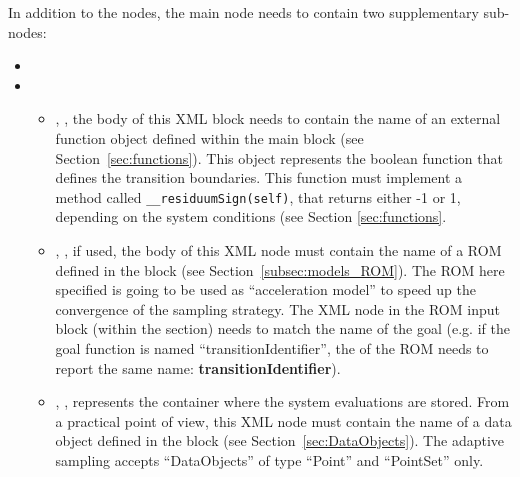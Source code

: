 In addition to the  nodes, the main
 node needs to contain two supplementary
sub-nodes:

\begin{itemize}
  \item \convergenceDescription
  \item {}
    \begin{itemize}
      \item {}, ,  the
        body of this XML block needs to contain the name of an external
        function object defined within the  main block (see
        Section~\ref{sec:functions}).
        This object represents the boolean function that defines the transition
        boundaries.
        This function must implement a method called
        \texttt{\_\_residuumSign(self)}, that returns either -1 or 1, depending
        on the system conditions (see Section \ref{sec:functions}.
      \item {}, , if used, the
        body of this XML node must contain the name of a ROM defined in the
         block (see Section~\ref{subsec:models_ROM}). The ROM
        here specified is going to be used as ``acceleration model'' to speed up the
        convergence of the sampling strategy. The  XML node in the ROM
        input block (within the  section) needs to match the name of the goal
         (e.g. if the goal function is named ``transitionIdentifier'', the  of the
        ROM needs to report the same name: \textbf{transitionIdentifier}).
      \item {}, ,
        represents the container where the system evaluations are stored.
        From a practical point of view, this XML node must contain the name of
        a data object defined in the  block (see
        Section~\ref{sec:DataObjects}).
        The adaptive sampling accepts ``DataObjects'' of type ``Point'' and
        ``PointSet'' only.
    \end{itemize}
\end{itemize}

